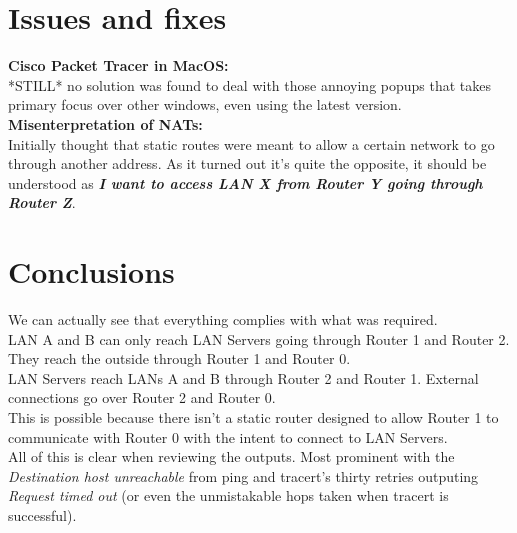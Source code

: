 \documentclass[11pt,a4paper]{report}
\begin{document}
        

        

\chapter{Issues and fixes}
    \textbf{Cisco Packet Tracer in MacOS:}\\
        \hspace*{10mm}*STILL* no solution was found to deal with those annoying popups that takes primary focus over other windows, even using the latest version.\\
    \textbf{Misenterpretation of NATs:}\\
        \hspace*{10mm}Initially thought that static routes were meant to allow a certain network to go through another address. As it turned out it's quite the opposite, it should be understood as \textbf{\textit{I want to access LAN X from Router Y going through Router Z}}.

\chapter{Conclusions}
    We can actually see that everything complies with what was required.\\
    LAN A and B can only reach LAN Servers going through Router 1 and Router 2. They reach the outside through Router 1 and Router 0.\\
    LAN Servers reach LANs A and B through Router 2 and Router 1. External connections go over Router 2 and Router 0.\\
    This is possible because there isn't a static router designed to allow Router 1 to communicate with Router 0 with the intent to connect to LAN Servers.\\
    All of this is clear when reviewing the outputs. Most prominent with the \textit{Destination host unreachable} from ping and tracert's thirty retries outputing \textit{Request timed out} (or even the unmistakable hops taken when tracert is successful).
\end{document}
